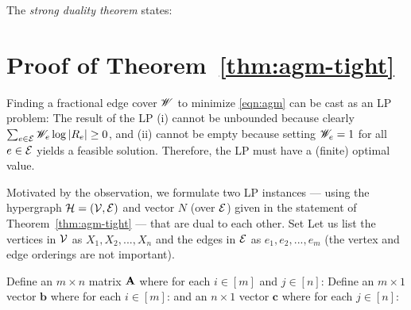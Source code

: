 \vgap

The {\em strong duality theorem} states:



\section{Proof of Theorem~\ref{thm:agm-tight}} \label{sec:proof}

Finding a fractional edge cover $\mathscr{W}$ to minimize \eqref{eqn:agm} can be cast as an LP problem:
The result of the LP (i) cannot be unbounded because clearly $\sum_{e \in \mathcal{E}} \mathscr{W}_e \log |R_e| \ge 0$, and (ii) cannot be empty because setting $\mathscr{W}_e = 1$ for all $e \in \mathcal{E}$ yields a feasible solution. Therefore, the LP must have a (finite) optimal value.

\vgap

Motivated by the observation, we formulate two LP instances --- using the hypergraph $\mathcal{H} = (\mathcal{V}, \mathcal{E})$ and vector $N$ (over $\mathcal{E}$) given in the statement of Theorem~\ref{thm:agm-tight} --- that are dual to each other. Set
Let us list the vertices in $\mathcal{V}$ as $X_1, X_2, ..., X_n$ and the edges in $\mathcal{E}$ as $e_1, e_2, ..., e_m$ (the vertex and edge orderings are not important).

\vgap

Define an $m \times n$ matrix $\mathbf{A}$ where for each $i \in [m]$ and $j \in [n]$:
Define an $m \times 1$ vector $\bm{b}$ where for each $i \in [m]$:
and an $n \times 1$ vector $\bm{c}$ where for each $j \in [n]$:

